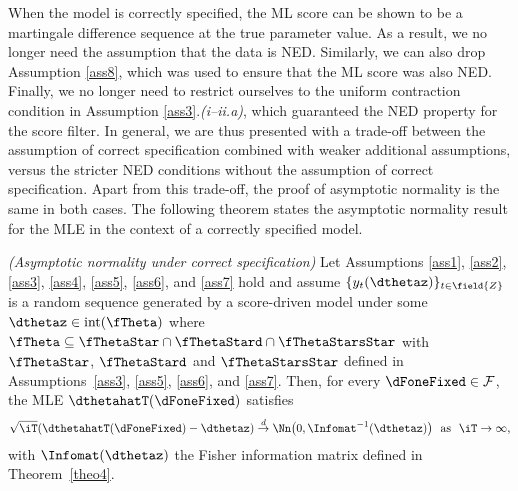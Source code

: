 
\noindent When the model is correctly specified, the ML score can be shown to be  a martingale difference sequence at the true parameter value. As a result,  we no longer need the assumption that the data is NED. Similarly, we can also drop Assumption \ref{ass8}, which was used to ensure that the ML score was also NED. Finally, we no longer need to restrict ourselves to the uniform contraction condition in Assumption \ref{ass3}.\textit{(i--ii.a)}, which guaranteed the NED property for the score filter. 
In general, we are thus presented with a trade-off between the assumption of correct specification combined with weaker additional assumptions, versus the stricter NED conditions without the assumption of correct specification. Apart from this trade-off, the proof of asymptotic normality is the same in both cases.  The following theorem states the asymptotic normality result for the MLE in the context of a correctly specified model.


\begin{theo} \label{cor2}
\emph{(Asymptotic normality under correct specification)}
    Let Assumptions \ref{ass1}, \ref{ass2}, \ref{ass3}, \ref{ass4}, \ref{ass5}, \ref{ass6}, and \ref{ass7} 
hold and assume $\{y_{t}(\dthetaz)\}_{t\in \field{Z}}$ is a random sequence generated by a score-driven model under some
$\dthetaz \in \mathrm{int}(\fTheta)$ where 
$\fTheta \subseteq \fThetaStar \cap  \fThetaStard \cap  \fThetaStarsStar$ 
with $\fThetaStar$, $\fThetaStard$ and $\fThetaStarsStar$ defined in Assumptions~\ref{ass3}, \ref{ass5}, \ref{ass6}, and \ref{ass7}.
Then, for every $\dFoneFixed \in \mathcal{F}$, the MLE $\dthetahatT(\dFoneFixed)$ satisfies  
\begin{equation*}
\sqrt{\iT}(\dthetahatT(\dFoneFixed) - \dthetaz) 
    \stackrel{d}{\to} 
    \Nn \big(0,\Infomat^{-1}(\dthetaz)\big) \ \text{ as } \ \iT \to \infty,
\end{equation*}
with $\Infomat(\dthetaz)$ the Fisher information matrix defined in Theorem~\ref{theo4}. 
\end{theo}


